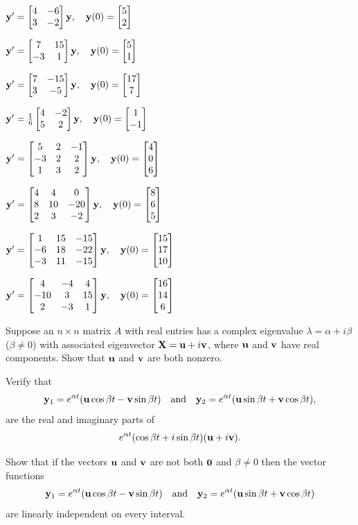 \begin{exerciselist}
\item\label{exer:10.6.17}$\mathbf{y}'=\begin{bmatrix}4&-6\\3&-2\end{bmatrix}\mathbf{y},\quad \mathbf{y}(0)=\begin{bmatrix}5\\2\end{bmatrix}$

\item\label{exer:10.6.18}$\mathbf{y}'=\begin{bmatrix}7&15\\-3&1\end{bmatrix}\mathbf{y},\quad \mathbf{y}(0)=\begin{bmatrix}5\\1\end{bmatrix}$

\item\label{exer:10.6.19}$\mathbf{y}'=\begin{bmatrix}7&-15\\3&-5\end{bmatrix}\mathbf{y},\quad \mathbf{y}(0)=\begin{bmatrix}17\\7\end{bmatrix}$

\item\label{exer:10.6.20}$\mathbf{y}'=\frac{1}{6}\begin{bmatrix}4&-2\\5&2\end{bmatrix}\mathbf{y},\quad \mathbf{y}(0)=\begin{bmatrix}1\\-1\end{bmatrix}$

\item\label{exer:10.6.21}$\mathbf{y}'=\begin{bmatrix}5&2&-1\\-3&2&2\\1&3&2\end{bmatrix}\mathbf{y},\quad \mathbf{y}(0)=\begin{bmatrix}4\\0\\6\end{bmatrix}$

\item\label{exer:10.6.22}$\mathbf{y}'=\begin{bmatrix}4&4&0\\8&10&-20\\2&3&-2\end{bmatrix}\mathbf{y},\quad \mathbf{y}(0)=\begin{bmatrix}8\\6\\5\end{bmatrix}$

\item\label{exer:10.6.23}$\mathbf{y}'=\begin{bmatrix}1&15&-15\\-6&18&-22\\-3&11&-15\end{bmatrix}\mathbf{y},\quad \mathbf{y}(0)=\begin{bmatrix}15\\17\\10\end{bmatrix}$

\item\label{exer:10.6.24}$\mathbf{y}'=\begin{bmatrix}4&-4&4\\-10&3&15\\2&-3&1\end{bmatrix}\mathbf{y},\quad
\mathbf{y}(0)=\begin{bmatrix}16\\14\\6\end{bmatrix}$

\item\label{exer:10.6.25}Suppose an $n\times n$ matrix $A$ with
real entries has a complex eigenvalue $\lambda=\alpha+i\beta$
($\beta\ne0$) with associated eigenvector $\mathbf{X}=\mathbf{u}+i\mathbf{v}$,
where $\mathbf{u}$ and $\mathbf{v}$ have real components. Show that $\mathbf{u}$ and $\mathbf{v}$ are both nonzero.

\item\label{exer:10.6.26}Verify that
\[
\mathbf{y}_1=e^{\alpha t}(\mathbf{u}\cos\beta t-\mathbf{v}\sin\beta t)
\quad\text{and}\quad
\mathbf{y}_2=e^{\alpha t}(\mathbf{u}\sin\beta t+\mathbf{v}\cos\beta t),
\]
are the real and imaginary parts of
\[
e^{\alpha t}(\cos\beta t+i\sin\beta t)(\mathbf{u}+i\mathbf{v}).
\]

\item\label{exer:10.6.27}Show that if the vectors $\mathbf{u}$ and $\mathbf{v}$ are not both $\mathbf{0}$ and $\beta\ne0$ then the vector functions
\[
\mathbf{y}_1=e^{\alpha t}(\mathbf{u}\cos\beta t-\mathbf{v}\sin\beta t)\quad
\text{and}\quad
\mathbf{y}_2=e^{\alpha t}(\mathbf{u}\sin\beta t+\mathbf{v}\cos\beta t)
\]
are linearly independent on every interval. 


\end{exerciselist}
